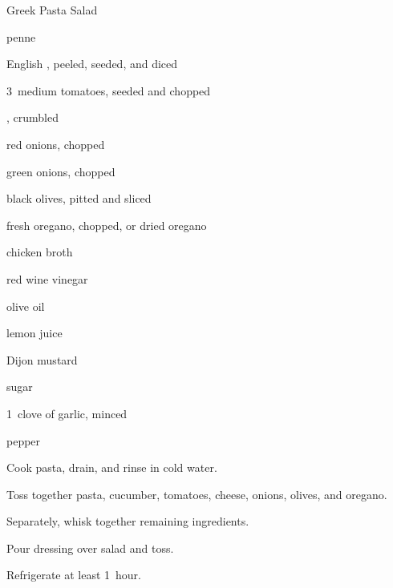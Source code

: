 \begin{recipe}{Greek Pasta Salad}{}{}

\begin{ingredients}
\item {} penne
\item \C{1\half} English , peeled, seeded, and diced
\item 3~medium tomatoes, seeded and chopped
\item {} , crumbled
\item \C{\half} red onions, chopped
\item \C{\quarter} green onions, chopped
\item \C{\quarter} black olives, pitted and sliced
\item \C{\quarter} fresh oregano, chopped, or  dried oregano
\item \C{\half} chicken broth
\item \C{\quarter} red wine vinegar
\item {} olive oil
\item {} lemon juice
\item {} Dijon mustard
\item {} sugar
\item 1~clove of garlic, minced
\item \tp{\quarter} pepper
\end{ingredients}

\begin{directions}
\item Cook pasta, drain, and rinse in cold water.
\item Toss together pasta, cucumber, tomatoes, cheese, onions, olives, and oregano.
\item Separately, whisk together remaining ingredients.
\item Pour dressing over salad and toss.
\item Refrigerate at least 1~hour.
\end{directions}

\end{recipe}
